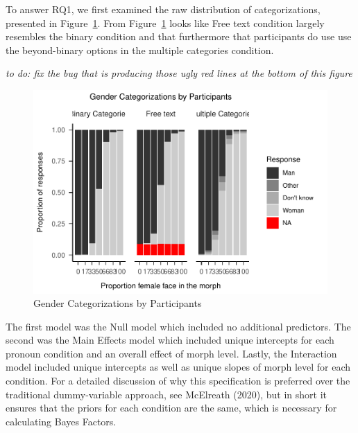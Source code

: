 \documentclass[
  man]{apa7}
\begin{document}
To answer RQ1, we first examined the raw distribution of categorizations, presented in Figure~\ref{fig:descriptives}. From Figure~\ref{fig:descriptives} looks like Free text condition largely resembles the binary condition and that furthermore that participants do use use the beyond-binary options in the multiple categories condition.

\emph{to do: fix the bug that is producing those ugly red lines at the bottom of this figure}

\begin{figure}
\centering
\includegraphics{resp_opts_manus23022_files/figure-latex/descriptives-1.pdf}
\caption{\label{fig:descriptives}Gender Categorizations by Participants}
\end{figure}

The first model was the Null model which included no additional predictors. The second was the Main Effects model which included unique intercepts for each pronoun condition and an overall effect of morph level. Lastly, the Interaction model included unique intercepts as well as unique slopes of morph level for each condition. For a detailed discussion of why this specification is preferred over the traditional dummy-variable approach, see McElreath (2020), but in short it ensures that the priors for each condition are the same, which is necessary for calculating Bayes Factors.
\end{document}
